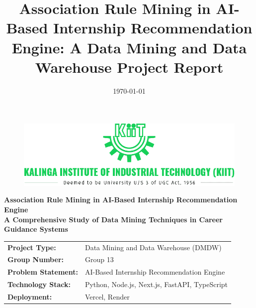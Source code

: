 \documentclass[12pt,a4paper]{article}
\title{\textbf{Association Rule Mining in AI-Based Internship Recommendation Engine: A Data Mining and Data Warehouse Project Report}}
\date{\today}
\begin{document}
\begin{titlepage}
    \centering
    
    \vspace*{0.5cm}
    
   \begin{figure}[H]
    \centering
    \includegraphics[width=1.0\textwidth]{KIIT-Logo-New1.png}
\end{figure}

    
   
    
    {\Huge \textbf{Association Rule Mining in AI-Based Internship Recommendation Engine}}\\[1cm]
    {\Large \textbf{A Comprehensive Study of Data Mining Techniques in Career Guidance Systems}}\\[2cm]
    
    \begin{minipage}{0.8\textwidth}
        \centering
        \begin{tabular}{ll}
            \textbf{Project Type:} & Data Mining and Data Warehouse (DMDW) \\
            \textbf{Group Number:} & Group 13 \\
            \textbf{Problem Statement:} & AI-Based Internship Recommendation Engine \\
            \textbf{Technology Stack:} & Python, Node.js, Next.js, FastAPI, TypeScript \\
            \textbf{Deployment:} & Vercel, Render \\
        \end{tabular}
    \end{minipage}
    
    \vspace{2cm}
    

\end{titlepage}
\end{document}
